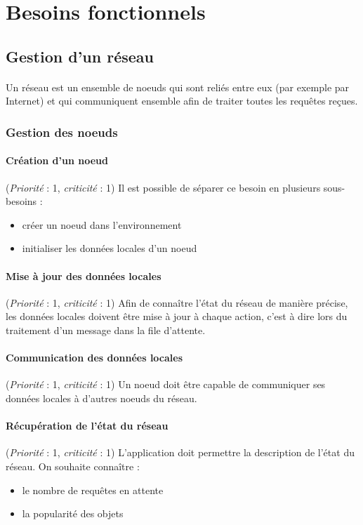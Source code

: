 \documentclass[12pt]{article}
\newcommand{\besoin}[2] {
  (\textit{Priorité} : #1, \textit{criticité} : #2)
}
\begin{document}
\newpage

\section{Besoins fonctionnels}

\subsection{Gestion d'un réseau}

\paragraph{} Un réseau est un ensemble de noeuds qui sont reliés entre eux (par exemple par Internet) et qui communiquent ensemble afin de traiter toutes les requêtes reçues.


\subsubsection{Gestion des noeuds}

\paragraph{Création d'un noeud} \besoin{1}{1} Il est possible de séparer ce besoin en plusieurs sous-besoins :
 \begin{itemize}
 	\item créer un noeud dans l'environnement
 	\item initialiser les données locales d'un noeud
 \end{itemize}

\paragraph{Mise à jour des données locales} \besoin{1}{1} Afin de connaître l'état du réseau de manière précise, les données locales doivent être mise à jour à chaque action,
c'est à dire lors du traitement d'un message dans la file d'attente.


\paragraph{Communication des données locales} \besoin{1}{1} Un noeud doit être capable de communiquer ses données locales à d'autres noeuds du réseau.

\paragraph{Récupération de l'état du réseau} \besoin{1}{1} L'application doit permettre la description de l'état du réseau.
On souhaite connaître : 
\begin{itemize}
 \item le nombre de requêtes en attente
 \item la popularité des objets
\end{itemize}
\end{document}
